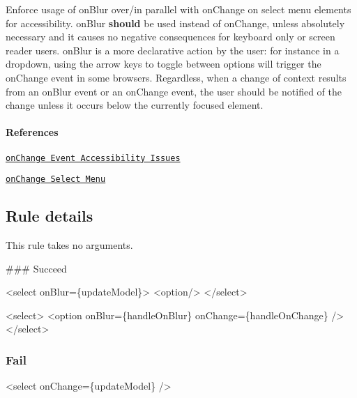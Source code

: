 Enforce usage of {\ttfamily on\+Blur} over/in parallel with {\ttfamily on\+Change} on select menu elements for accessibility. {\ttfamily on\+Blur} {\bfseries should} be used instead of {\ttfamily on\+Change}, unless absolutely necessary and it causes no negative consequences for keyboard only or screen reader users. {\ttfamily on\+Blur} is a more declarative action by the user\+: for instance in a dropdown, using the arrow keys to toggle between options will trigger the {\ttfamily on\+Change} event in some browsers. Regardless, when a change of context results from an {\ttfamily on\+Blur} event or an {\ttfamily on\+Change} event, the user should be notified of the change unless it occurs below the currently focused element.

\paragraph*{References}


\begin{DoxyEnumerate}
\item \href{http://cita.disability.uiuc.edu/html-best-practices/auto/onchange.php}{\tt on\+Change Event Accessibility Issues}
\item \href{http://www.themaninblue.com/writing/perspective/2004/10/19/}{\tt on\+Change Select Menu}
\end{DoxyEnumerate}

\subsection*{Rule details}

This rule takes no arguments.

\#\#\# Succeed 
\begin{DoxyCode}
<select onBlur=\{updateModel\}>
  <option/>
</select>

<select>
  <option onBlur=\{handleOnBlur\} onChange=\{handleOnChange\} />
</select>
\end{DoxyCode}


\subsubsection*{Fail}


\begin{DoxyCode}
<select onChange=\{updateModel\} />
\end{DoxyCode}
 